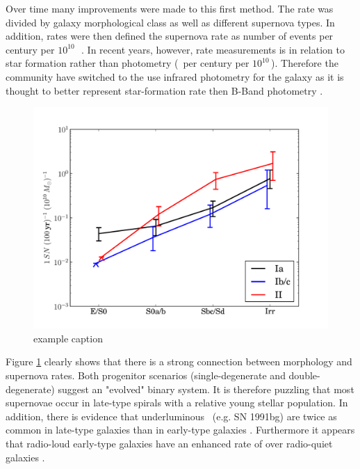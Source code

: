Over time many improvements were made to this first method. The rate was divided by galaxy morphological class as well as different supernova types. In addition, rates were then defined the supernova rate as number of events per century per $10^{10}$\,\lsun\ \citep[e.g.][]{1991ARA&A..29..363V,1994ApJS...92..487T}. In recent years, however, rate measurements is in relation to star formation rather than photometry (\sn\ per century per $10^{10}$\,\msun).  Therefore the community \citep[e.g.][]{2005A&A...433..807M} have switched to the use infrared photometry for the galaxy as it is thought to better represent star-formation rate then B-Band photometry \citep{2003A&A...410...83H}. 
\begin{figure}[htbp] %
   \centering
   \includegraphics[width=\textwidth]{chapter_intro/plots/snrates_mannucci05.pdf} 
   \caption{example caption}
   \label{fig:snrates_mannucci05}
\end{figure}

Figure \ref{fig:snrates_mannucci05} clearly shows that there is a strong connection between morphology and supernova rates. 
Both progenitor scenarios (single-degenerate and double-degenerate) suggest an "evolved" binary system. It is therefore puzzling that most supernovae occur in late-type spirals with a relative young stellar population. 
In addition, there is evidence that underluminous \sneia\ (e.g. SN 1991bg) are twice as common in late-type galaxies than in early-type galaxies \citep{2001ApJ...554L.193H}. 
Furthermore it appears that radio-loud early-type galaxies have an enhanced rate of \sneia over radio-quiet galaxies \citep{2003ApJ...587L..71D}. 

